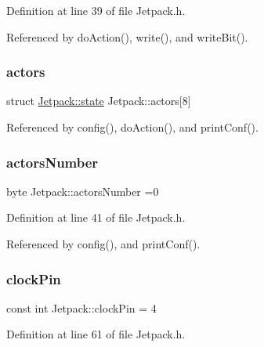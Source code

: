 Definition at line 39 of file Jetpack.\+h.



Referenced by do\+Action(), write(), and write\+Bit().

\mbox{\label{classJetpack_a7e16d2f97837f9712a2e6de1c50d99db}} 
\subsubsection{\texorpdfstring{actors}{actors}}
{\footnotesize\ttfamily struct \hyperlink{structJetpack_1_1state}{Jetpack\+::state} Jetpack\+::actors\mbox{[}8\mbox{]}\hspace{0.3cm}{\ttfamily [private]}}



Referenced by config(), do\+Action(), and print\+Conf().

\mbox{\label{classJetpack_a52c86319cb3f7f1ab744a64db18a7ba5}} 
\subsubsection{\texorpdfstring{actors\+Number}{actorsNumber}}
{\footnotesize\ttfamily byte Jetpack\+::actors\+Number =0\hspace{0.3cm}{\ttfamily [private]}}



Definition at line 41 of file Jetpack.\+h.



Referenced by config(), and print\+Conf().

\mbox{\label{classJetpack_a58ebb991f358f3ae94e82148b0221b5a}} 
\subsubsection{\texorpdfstring{clock\+Pin}{clockPin}}
{\footnotesize\ttfamily const int Jetpack\+::clock\+Pin = 4\hspace{0.3cm}{\ttfamily [private]}}



Definition at line 61 of file Jetpack.\+h.




